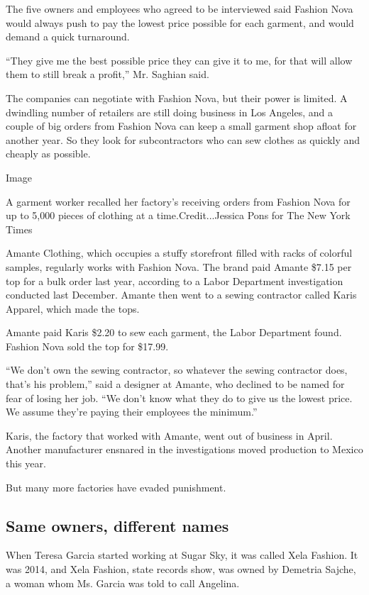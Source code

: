 The five owners and employees who agreed to be interviewed said Fashion
Nova would always push to pay the lowest price possible for each
garment, and would demand a quick turnaround.

``They give me the best possible price they can give it to me, for that
will allow them to still break a profit,'' Mr. Saghian said.

The companies can negotiate with Fashion Nova, but their power is
limited. A dwindling number of retailers are still doing business in Los
Angeles, and a couple of big orders from Fashion Nova can keep a small
garment shop afloat for another year. So they look for subcontractors
who can sew clothes as quickly and cheaply as possible.

Image

A garment worker recalled her factory's receiving orders from Fashion
Nova for up to 5,000 pieces of clothing at a time.Credit...Jessica Pons
for The New York Times

Amante Clothing, which occupies a stuffy storefront filled with racks of
colorful samples, regularly works with Fashion Nova. The brand paid
Amante \$7.15 per top for a bulk order last year, according to a Labor
Department investigation conducted last December. Amante then went to a
sewing contractor called Karis Apparel, which made the tops.

Amante paid Karis \$2.20 to sew each garment, the Labor Department
found. Fashion Nova sold the top for \$17.99.

``We don't own the sewing contractor, so whatever the sewing contractor
does, that's his problem,'' said a designer at Amante, who declined to
be named for fear of losing her job. ``We don't know what they do to
give us the lowest price. We assume they're paying their employees the
minimum.''

Karis, the factory that worked with Amante, went out of business in
April. Another manufacturer ensnared in the investigations moved
production to Mexico this year.

But many more factories have evaded punishment.

\hypertarget{same-owners-different-names}{%
\subsection{Same owners, different
names}\label{same-owners-different-names}}

When Teresa Garcia started working at Sugar Sky, it was called Xela
Fashion. It was 2014, and Xela Fashion, state records show, was owned by
Demetria Sajche, a woman whom Ms. Garcia was told to call Angelina.

